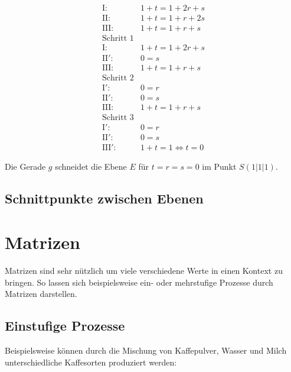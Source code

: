 \begin{flushleft}
\begin{align}
    \text{I}\colon& 1+t=1+2r+s \\
    \text{II}\colon& 1+t=1+r+2s \\
    \text{III}\colon& 1+t=1+r+s \\
    \text{Schritt 1}& \\
    \text{I}\colon& 1+t=1+2r+s \\
    \text{II}'\colon& 0=s \\
    \text{III}\colon& 1+t=1+r+s \\
    \text{Schritt 2}& \\
    \text{I}'\colon& 0=r \\
    \text{II}'\colon& 0=s \\
    \text{III}\colon& 1+t=1+r+s \\
    \text{Schritt 3}& \\
    \text{I}'\colon& 0=r \\
    \text{II}'\colon& 0=s \\
    \text{III}'\colon& 1+t=1 \Leftrightarrow t=0
\end{align}

Die Gerade $g$ schneidet die Ebene $E$ für $t=r=s=0$ im Punkt $S(1|1|1)$.
\end{flushleft}

\subsection{Schnittpunkte zwischen Ebenen}

\section{Matrizen}
\begin{flushleft}
Matrizen sind sehr nützlich um viele verschiedene Werte in einen Kontext zu bringen.
So lassen sich beispielsweise ein- oder mehrstufige Prozesse durch Matrizen darstellen.
\end{flushleft}

\subsection{Einstufige Prozesse}
\begin{flushleft}   
Beispielsweise können durch die Mischung von Kaffepulver, Wasser und Milch unterschiedliche Kaffesorten produziert werden:
\end{flushleft}

